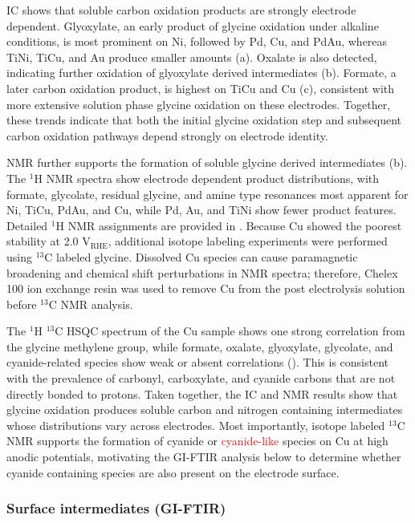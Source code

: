 \documentclass[twoside,twocolumn,9pt]{article}
\begin{document}
IC shows that soluble carbon oxidation products are strongly electrode dependent. Glyoxylate, an early product of glycine oxidation under alkaline conditions, is most prominent on Ni, followed by Pd, Cu, and PdAu, whereas TiNi, TiCu, and Au produce smaller amounts (a). Oxalate is also detected, indicating further oxidation of glyoxylate derived intermediates (b). Formate, a later carbon oxidation product, is highest on TiCu and Cu (c), consistent with more extensive solution phase glycine oxidation on these electrodes. Together, these trends indicate that both the initial glycine oxidation step and subsequent carbon oxidation pathways depend strongly on electrode identity.

NMR further supports the formation of soluble glycine derived intermediates (b). The $^1$H NMR spectra show electrode dependent product distributions, with formate, glycolate, residual glycine, and amine type resonances most apparent for Ni, TiCu, PdAu, and Cu, while Pd, Au, and TiNi show fewer product features. Detailed $^1$H NMR assignments are provided in . Because Cu showed the poorest stability at 2.0 V$_{\mathrm{RHE}}$, additional isotope labeling experiments were performed using $^{13}$C labeled glycine. Dissolved Cu species can cause paramagnetic broadening and chemical shift perturbations in NMR spectra; therefore, Chelex 100 ion exchange resin was used to remove Cu from the post electrolysis solution before $^{13}$C NMR analysis.


The $^1$H $^{13}$C HSQC spectrum of the Cu sample shows one strong correlation from the glycine methylene group, while formate, oxalate, glyoxylate, glycolate, and cyanide-related species show weak or absent correlations (). This is consistent with the prevalence of carbonyl, carboxylate, and cyanide carbons that are not directly bonded to protons. Taken together, the IC and NMR results show that glycine oxidation produces soluble carbon and nitrogen containing intermediates whose distributions vary across electrodes. Most importantly, isotope labeled $^{13}$C NMR supports the formation of cyanide or \textcolor{red}{cyanide-like} species on Cu at high anodic potentials, motivating the GI-FTIR analysis below to determine whether cyanide containing species are also present on the electrode surface.



\subsubsection{Surface intermediates (GI-FTIR)}
\label{sec:FTIR_NMR}
\end{document}
